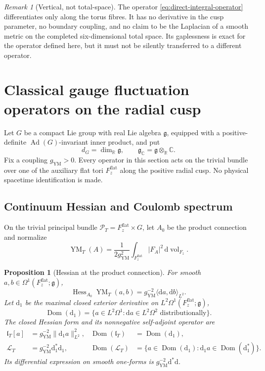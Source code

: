 \documentclass[11pt]{article}
\numberwithin{equation}{section}
\newtheorem{proposition}[theorem]{Proposition}
\theoremstyle{definition}
\theoremstyle{remark}
\newtheorem{remark}[theorem]{Remark}
\newcommand{\R}{\mathbb R}
\newcommand{\C}{\mathbb C}
\newcommand{\dd}{\mathrm d}
\begin{document}
\begin{remark}[Vertical, not total-space]
The operator \eqref{eq:direct-integral-operator} differentiates only along the torus fibres.  It has no derivative in the cusp parameter, no boundary coupling, and no claim to be the Laplacian of a smooth metric on the completed six-dimensional total space.  Its gaplessness is exact for the operator defined here, but it must not be silently transferred to a different operator.
\end{remark}

\section{Classical gauge fluctuation operators on the radial cusp}

Let $G$ be a compact Lie group with real Lie algebra $\mathfrak g$, equipped
with a positive-definite $\operatorname{Ad}(G)$-invariant inner product, and
put
\[
 d_G=\dim_{\R}\mathfrak g,\qquad
 \mathfrak g_{\C}=\mathfrak g\otimes_{\R}\C.
\]
Fix a coupling $g_{\mathrm{YM}}>0$.  Every operator in this section acts on
the trivial bundle over one of the auxiliary flat tori
$F_z^{\mathrm{flat}}$ along the positive radial cusp.  No physical spacetime
identification is made.

\subsection{Continuum Hessian and Coulomb spectrum}

On the trivial principal bundle
$\mathcal P_T=F_z^{\mathrm{flat}}\times G$, let $A_0$ be the product
connection and normalize
\begin{equation}\label{eq:YM-functional}
 \operatorname{YM}_T(A)=\frac1{2g_{\mathrm{YM}}^2}
 \int_{F_z^{\mathrm{flat}}}|F_A|^2\,\dd\operatorname{vol}_{F_z}.
\end{equation}

\begin{proposition}[Hessian at the product connection]
\label{prop:YM-Hessian}
For smooth $a,b\in\Omega^1(F_z^{\mathrm{flat}};\mathfrak g)$,
\begin{equation}\label{eq:YM-Hessian-bilinear}
 \operatorname{Hess}_{A_0}\operatorname{YM}_T(a,b)
 =g_{\mathrm{YM}}^{-2}\langle\dd a,\dd b\rangle_{L^2}.
\end{equation}
Let $\dd_1$ be the maximal closed exterior derivative on
$L^2\Omega^1(F_z^{\mathrm{flat}};\mathfrak g)$,
\[
 \operatorname{Dom}(\dd_1)=\{a\in L^2\Omega^1:
 \dd a\in L^2\Omega^2\text{ distributionally}\}.
\]
The closed Hessian form and its nonnegative self-adjoint operator are
\begin{align}
 \mathfrak l_T[a]&=g_{\mathrm{YM}}^{-2}\|\dd_1a\|_{L^2}^2,
 &\operatorname{Dom}(\mathfrak l_T)&=\operatorname{Dom}(\dd_1),
 \label{eq:YM-closed-form}\\
 \mathcal L_T&=g_{\mathrm{YM}}^{-2}\dd_1^*\dd_1,
 &\operatorname{Dom}(\mathcal L_T)
 &=\{a\in\operatorname{Dom}(\dd_1):
 \dd_1a\in\operatorname{Dom}(\dd_1^*)\}.
 \label{eq:YM-Hessian-operator}
\end{align}
Its differential expression on smooth one-forms is
$g_{\mathrm{YM}}^{-2}\dd^*\dd$.
\end{proposition}
\end{document}
